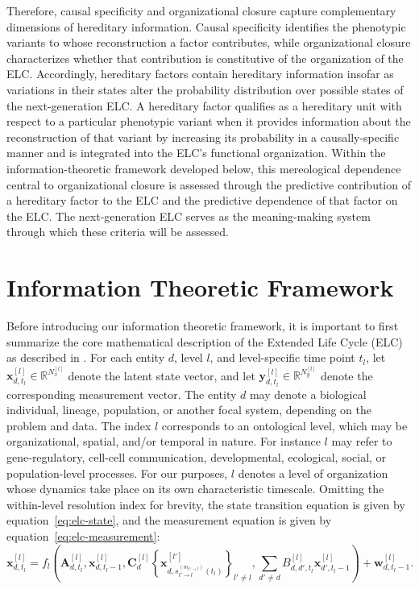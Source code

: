 \documentclass[pdflatex,sn-mathphys-num]{sn-jnl}
\theoremstyle{thmstylethree}
\theoremstyle{thmstyleone}
\begin{document}
Therefore, causal specificity and organizational closure capture complementary dimensions of hereditary information. Causal specificity identifies the phenotypic variants to whose reconstruction a factor contributes, while organizational closure characterizes whether that contribution is constitutive of the organization of the ELC. Accordingly, hereditary factors contain hereditary information insofar as variations in their states alter the probability distribution over possible states of the next-generation ELC. A hereditary factor qualifies as a hereditary unit with respect to a particular phenotypic variant when it provides information about the reconstruction of that variant by increasing its probability in a causally-specific manner and is integrated into the ELC’s functional organization. Within the information-theoretic framework developed below, this mereological dependence central to organizational closure is assessed through the predictive contribution of a hereditary factor to the ELC and the predictive dependence of that factor on the ELC. The next-generation ELC serves as the meaning-making system through which these criteria will be assessed.

\section{Information Theoretic Framework}
Before introducing our information theoretic framework, it is important to first summarize the core mathematical description of the Extended Life Cycle (ELC) as described in \cite{velez2026extended}. For each entity $d$, level $l$, and level-specific time point $t_l$, let
$\mathbf{x}_{d,t_l}^{[l]} \in \mathbb{R}^{N_x^{[l]}}$ denote the latent state vector, and let
$\mathbf{y}_{d,t_l}^{[l]} \in \mathbb{R}^{N_y^{[l]}}$ denote the corresponding measurement vector. The entity $d$ may denote a biological individual, lineage, population, or another focal system, depending on the problem and data. The index $l$ corresponds to an ontological level, which may be organizational, spatial, and/or temporal in nature. For instance $l$ may refer to gene-regulatory, cell-cell communication, developmental, ecological, social, or population-level processes. For our purposes, $l$ denotes a level of organization whose dynamics take place on its own characteristic timescale. Omitting the within-level resolution index for brevity, the state transition equation is given by equation~\eqref{eq:elc-state}, and the measurement equation is given by equation~\eqref{eq:elc-measurement}:
\begin{equation}
\mathbf{x}_{d,t_l}^{[l]}
=
f_l\!\left(
\mathbf{A}_{d,t_l}^{[l]},
\mathbf{x}_{d,t_l-1}^{[l]},
\mathbf{C}_{d}^{[l]}
\left\{
\mathbf{x}_{d,s_{l'\to l}^{(m_{l'\to l})}(t_l)}^{[l']}
\right\}_{l' \neq l},
\sum_{d' \neq d}
B_{d,d',t_l}^{[l]}
\mathbf{x}_{d',t_l-1}^{[l]}
\right)
+
\mathbf{w}_{d,t_l-1}^{[l]} .
\label{eq:elc-state}
\end{equation}
\end{document}
